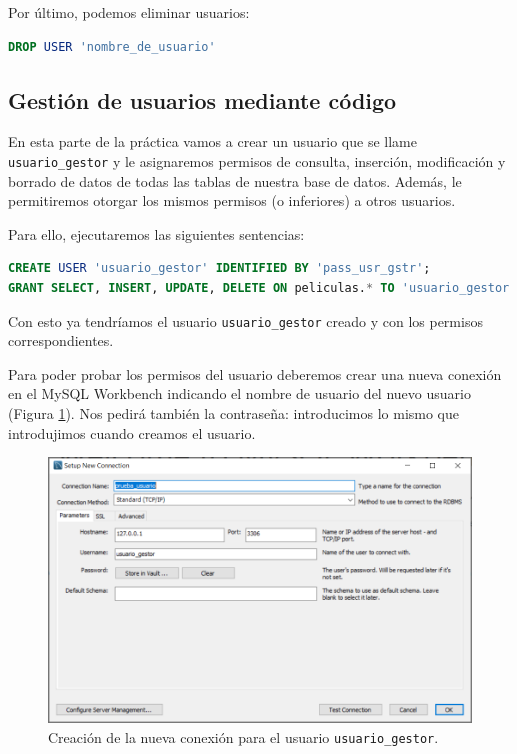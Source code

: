 \documentclass{db-practice}
\begin{document}
Por último, podemos eliminar usuarios:

\begin{lstlisting}[language=SQL]
DROP USER 'nombre_de_usuario'
\end{lstlisting}


\subsection*{Gestión de usuarios mediante código}

En esta parte de la práctica vamos a crear un usuario que se llame \texttt{usuario\_gestor} y le asignaremos permisos de consulta, inserción, modificación y borrado de datos de todas las tablas de nuestra base de datos. Además, le permitiremos otorgar los mismos permisos (o inferiores) a otros usuarios.

Para ello, ejecutaremos las siguientes sentencias:

\begin{lstlisting}[language=SQL]
CREATE USER 'usuario_gestor' IDENTIFIED BY 'pass_usr_gstr';
GRANT SELECT, INSERT, UPDATE, DELETE ON peliculas.* TO 'usuario_gestor';
\end{lstlisting}

Con esto ya tendríamos el usuario \texttt{usuario\_gestor} creado y con los permisos correspondientes.

Para poder probar los permisos del usuario deberemos crear una nueva conexión en el MySQL Workbench indicando el nombre de usuario del nuevo usuario (Figura \ref{fig:nueva-conexion}). Nos pedirá también la contraseña: introducimos lo mismo que introdujimos cuando creamos el usuario.

\begin{figure}[H]
    \centering
    \includegraphics[width=\textwidth]{figs/gestion-usuarios/nueva_conexion_usr.PNG}
    \caption{Creación de la nueva conexión para el usuario \texttt{usuario\_gestor}.}
    \label{fig:nueva-conexion}
\end{figure}
\end{document}
